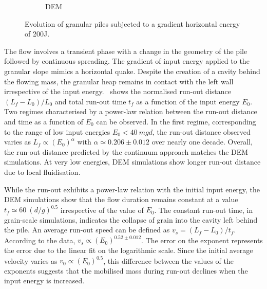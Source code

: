 \documentclass[3p,times,procedia,number]{elsarticle}
\begin{document}
\begin{figure}[tbph]
\begin{subfigure}[b]{0.42\textwidth}
    \caption{DEM}
    \label{fig:dem_gradvelocity_200j}
  \end{subfigure}
  \caption{Evolution of granular piles subjected to a gradient
    horizontal energy of 200J.}
  \label{fig:gradvelocity_200j}
\end{figure}


The flow involves a transient phase with a change in the geometry of the pile 
followed by continuous spreading. The gradient of input energy applied to the 
granular slope mimics a horizontal quake. Despite the creation of a cavity
behind the flowing mass, the granular heap remains in contact with the left
wall irrespective of the input energy.~ shows the
normalised run-out distance $(L_f - L_0)/L_0$ and total run-out time $t_f$ as a
function of the input energy $E_0$. Two regimes characterised by a power-law
relation between the run-out distance and time as a function of $E_0$ can be
observed. In the first regime, corresponding to the range of low input energies
$E_0 < 40 \ mgd$, the run-out distance observed varies as $L_f \propto
(E_0)^\alpha$ with $\alpha \simeq 0.206 \pm 0.012$ over nearly one decade.
Overall, the run-out distance predicted by the continuum approach matches the
DEM simulations. At very low energies, DEM simulations show longer run-out
distance due to local fluidisation.


While the run-out exhibits a power-law relation with the initial input energy, 
the DEM simulations show that the flow duration remains constant at a value  
$t_f \simeq 60 \  (d/g)^{0.5}$ irrespective of the value of $E_0$. The constant 
run-out time, in grain-scale simulations, indicates the collapse of grain into 
the cavity left behind the pile. An average run-out speed can be defined as 
$v_s = (L_f - L_0) / t_f$. According to the data, $v_s \propto 
(E_0)^{0.52\pm 0.012}$. The error on the exponent represents the error due to
the linear fit on the logarithmic scale. Since the initial average velocity
varies as $v_0 \propto (E_0)^{0.5}$, this difference between the values of the
exponents suggests that the mobilised mass during run-out declines when the
input energy is increased.
\end{document}
